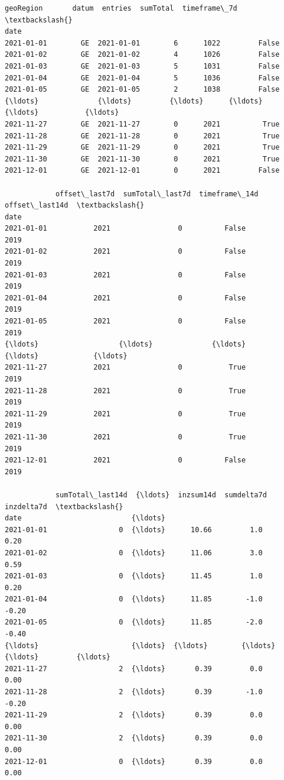 \documentclass[11pt]{article}
\begin{document}
            \begin{tcolorbox}[breakable, size=fbox, boxrule=.5pt, pad at break*=1mm, opacityfill=0]
\begin{Verbatim}[commandchars=\\\{\}]
           geoRegion       datum  entries  sumTotal  timeframe\_7d  \textbackslash{}
date
2021-01-01        GE  2021-01-01        6      1022         False
2021-01-02        GE  2021-01-02        4      1026         False
2021-01-03        GE  2021-01-03        5      1031         False
2021-01-04        GE  2021-01-04        5      1036         False
2021-01-05        GE  2021-01-05        2      1038         False
{\ldots}              {\ldots}         {\ldots}      {\ldots}       {\ldots}           {\ldots}
2021-11-27        GE  2021-11-27        0      2021          True
2021-11-28        GE  2021-11-28        0      2021          True
2021-11-29        GE  2021-11-29        0      2021          True
2021-11-30        GE  2021-11-30        0      2021          True
2021-12-01        GE  2021-12-01        0      2021         False

            offset\_last7d  sumTotal\_last7d  timeframe\_14d  offset\_last14d  \textbackslash{}
date
2021-01-01           2021                0          False            2019
2021-01-02           2021                0          False            2019
2021-01-03           2021                0          False            2019
2021-01-04           2021                0          False            2019
2021-01-05           2021                0          False            2019
{\ldots}                   {\ldots}              {\ldots}            {\ldots}             {\ldots}
2021-11-27           2021                0           True            2019
2021-11-28           2021                0           True            2019
2021-11-29           2021                0           True            2019
2021-11-30           2021                0           True            2019
2021-12-01           2021                0          False            2019

            sumTotal\_last14d  {\ldots}  inzsum14d  sumdelta7d  inzdelta7d  \textbackslash{}
date                          {\ldots}
2021-01-01                 0  {\ldots}      10.66         1.0        0.20
2021-01-02                 0  {\ldots}      11.06         3.0        0.59
2021-01-03                 0  {\ldots}      11.45         1.0        0.20
2021-01-04                 0  {\ldots}      11.85        -1.0       -0.20
2021-01-05                 0  {\ldots}      11.85        -2.0       -0.40
{\ldots}                      {\ldots}  {\ldots}        {\ldots}         {\ldots}         {\ldots}
2021-11-27                 2  {\ldots}       0.39         0.0        0.00
2021-11-28                 2  {\ldots}       0.39        -1.0       -0.20
2021-11-29                 2  {\ldots}       0.39         0.0        0.00
2021-11-30                 2  {\ldots}       0.39         0.0        0.00
2021-12-01                 0  {\ldots}       0.39         0.0        0.00


\end{Verbatim}
\end{tcolorbox}
\end{document}
